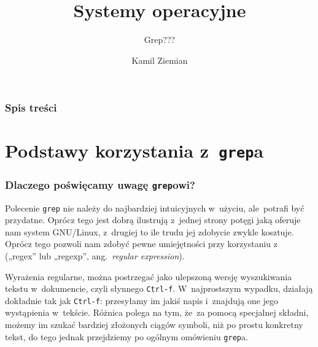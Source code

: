 \documentclass[10pt,t]{beamer}
\title{Systemy operacyjne}
\subtitle{Grep???}
\author{Kamil Ziemian \\
  \email}
\begin{document}





\RaggedRight





\maketitle





\begin{frame}
  \frametitle{Spis treści}


  \tableofcontents

\end{frame}





\section{Podstawy korzystania z~\texttt{grep}a}


\begin{frame}
  \frametitle{Dlaczego poświęcamy uwagę \texttt{grep}owi?}


  Polecenie \texttt{grep} nie należy do najbardziej intuicyjnych w~użyciu,
  ale~potrafi być przydatne. Oprócz tego jest dobrą ilustrują z~jednej
  strony potęgi jaką oferuje nam system GNU/Linux, z~drugiej to ile
  trudu jej zdobycie zwykle kosztuje. Oprócz tego pozwoli nam zdobyć
  pewne umiejętności przy korzystaniu
  z~ („regex” lub „regexp”, ang.~\textit{regular expression}).

  Wyrażenia regularne, można postrzegać jako ulepszoną wersję wyszukiwania
  tekstu w~dokumencie, czyli słynnego \texttt{Ctrl-f}. W~najprostszym
  wypadku, działają dokładnie tak jak \texttt{Ctrl-f}: przesyłamy im
  jakiś napis i~znajdują one jego wystąpienia w~tekście. Różnica polega na
  tym, że~za pomocą specjalnej składni, możemy im szukać bardziej złożonych
  ciągów symboli, niż po prostu konkretny tekst, do tego jednak przejdziemy
  po ogólnym omówieniu \texttt{grep}a.

\end{frame}
\end{document}
